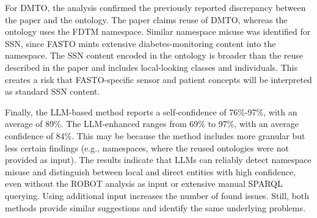 \documentclass[
]{ceurart}
\begin{document}
For DMTO, the analysis confirmed the previously reported discrepancy between the paper and the ontology. The paper claims reuse of DMTO, whereas the ontology uses the FDTM namespace. Similar namespace misuse was identified for SSN, since FASTO mints extensive diabetes-monitoring content into the namespace. The SSN content encoded in the ontology is broader than the reuse described in the paper and includes local-looking classes and individuals. This creates a risk that FASTO-specific sensor and patient concepts will be interpreted as standard SSN content. 

Finally, the LLM-based method reports a self-confidence of 76\%-97\%, with an average of 89\%. The LLM-enhanced ranges from 69\% to 97\%, with an average confidence of 84\%. This may be because the method includes more granular but less certain findings (e.g., namespaces, where the reused ontologies were not provided as input). The results indicate that LLMs can reliably detect namespace misuse and distinguish between local and direct entities with high confidence, even without the ROBOT analysis as input or extensive manual SPARQL querying. Using additional input increases the number of found issues. Still, both methods provide similar suggestions and identify the same underlying problems. 
\end{document}
